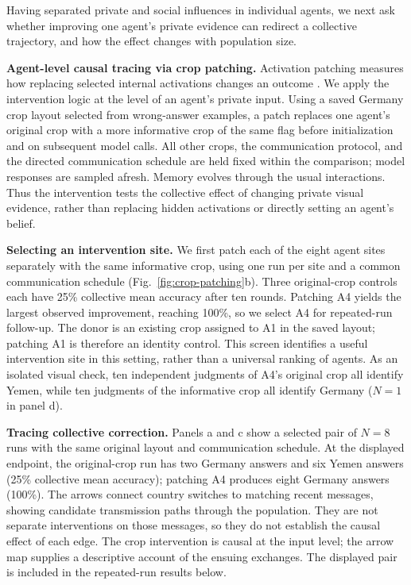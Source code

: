 Having separated private and social influences in individual agents, we next ask whether improving one agent's private evidence can redirect a collective trajectory, and how the effect changes with population size.

\textbf{Agent-level causal tracing via crop patching.} Activation patching measures how replacing selected internal activations changes an outcome \citep{meng2022locating,zhang2024patching}. We apply the intervention logic at the level of an agent's private input. Using a saved Germany crop layout selected from wrong-answer examples, a patch replaces one agent's original crop with a more informative crop of the same flag before initialization and on subsequent model calls. All other crops, the communication protocol, and the directed communication schedule are held fixed within the comparison; model responses are sampled afresh. Memory evolves through the usual interactions. Thus the intervention tests the collective effect of changing private visual evidence, rather than replacing hidden activations or directly setting an agent's belief.

\textbf{Selecting an intervention site.} We first patch each of the eight agent sites separately with the same informative crop, using one run per site and a common communication schedule (Fig.~\ref{fig:crop-patching}b). Three original-crop controls each have 25\% collective mean accuracy after ten rounds. Patching A4 yields the largest observed improvement, reaching 100\%, so we select A4 for repeated-run follow-up. The donor is an existing crop assigned to A1 in the saved layout; patching A1 is therefore an identity control. This screen identifies a useful intervention site in this setting, rather than a universal ranking of agents. As an isolated visual check, ten independent judgments of A4's original crop all identify Yemen, while ten judgments of the informative crop all identify Germany (\(N=1\) in panel d).

\textbf{Tracing collective correction.} Panels a and c show a selected pair of \(N=8\) runs with the same original layout and communication schedule. At the displayed endpoint, the original-crop run has two Germany answers and six Yemen answers (25\% collective mean accuracy); patching A4 produces eight Germany answers (100\%). The arrows connect country switches to matching recent messages, showing candidate transmission paths through the population. They are not separate interventions on those messages, so they do not establish the causal effect of each edge. The crop intervention is causal at the input level; the arrow map supplies a descriptive account of the ensuing exchanges. The displayed pair is included in the repeated-run results below.

